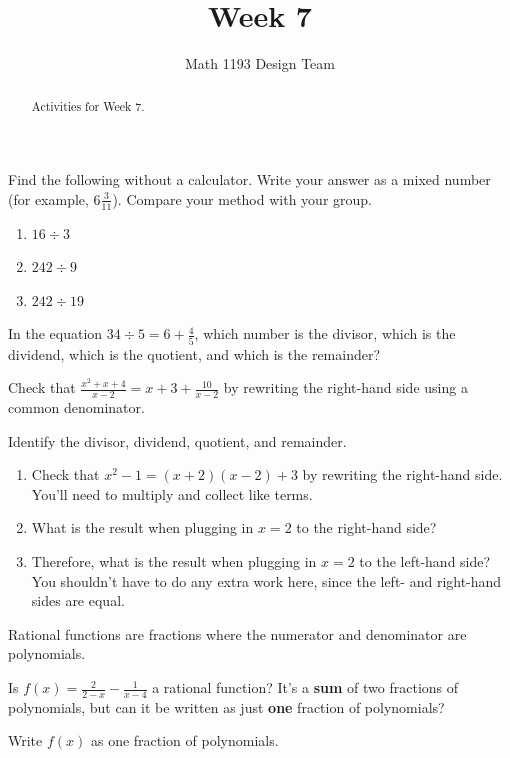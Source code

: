 \documentclass[noauthor,noinstructornotes]{ximera}
\title{Week 7}
\author{Math 1193 Design Team}
\begin{document}
\begin{abstract}
    Activities for Week 7.
\end{abstract}
\maketitle

\begin{problem}
Find the following without a calculator. Write your answer as a 
mixed number (for example, \(6 \frac{3}{11}\)). Compare your method 
with your group.

\begin{enumerate}
    \item \(16 \div 3\)
    \item \(242 \div 9\)
    \item \(242 \div 19\)
\end{enumerate}
\end{problem}

\begin{problem}
In the equation \(34 \div 5 = 6 + \frac{4}{5}\), which number
is the divisor, which is the dividend, which is the quotient, and 
which is the remainder?
\end{problem}

\begin{problem}
Check that \(\frac{x^2 + x + 4}{x - 2} = x + 3 + \frac{10}{x - 2}\) by
rewriting the right-hand side using a common denominator. 

Identify the divisor, dividend, quotient, and remainder.

\end{problem}

\begin{problem}
\begin{enumerate}
    \item Check that \(x^2 - 1 = (x + 2)(x - 2) + 3\) by rewriting the right-hand
    side. You'll need to multiply and collect like terms.
    \item What is the result when plugging in \(x = 2\) to the right-hand side?
    \item Therefore, what is the result when plugging in \(x = 2\) to the left-hand
    side? You shouldn't have to do any extra work here, since the
    left- and right-hand sides are equal.
\end{enumerate}

\end{problem}

\begin{problem}
Rational functions are fractions where the numerator and
denominator are polynomials.

Is \(f(x) = \frac{2}{2 - x} - \frac{1}{x - 4}\) a rational function?
It's a \textbf{sum} of two fractions of polynomials, but can it be
written as just \textbf{one} fraction of polynomials?

Write \(f(x)\) as one fraction of polynomials.
\end{problem}
\end{document}
